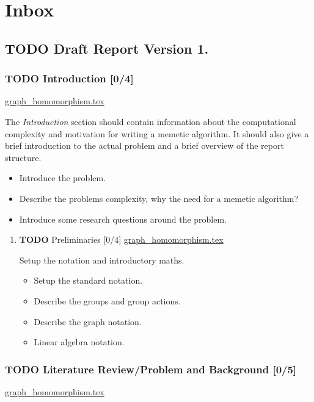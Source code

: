 \documentclass[11pt]{article}
\author{Euan Mendoza}
\date{\today}
\title{}
\begin{document}
\tableofcontents

\section{Inbox}
\label{sec:org5a95c71}
\subsection{{\bfseries\sffamily TODO} Draft Report Version 1.}
\label{sec:org92e5479}
\subsubsection{{\bfseries\sffamily TODO} Introduction [0/4]}
\label{sec:orgb53d6fd}
\url{graph\_homomorphism.tex}

The \emph{Introduction} section should contain information about the computational complexity and motivation for writing a memetic algorithm. It should also give a brief introduction to the actual problem and a brief overview of the report structure.

\begin{itemize}
\item[{$\square$}] Introduce the problem.
\item[{$\square$}] Describe the problems complexity, why the need for a memetic algorithm?
\item[{$\square$}] Introduce some research questions around the problem.
\end{itemize}
\begin{enumerate}
\item {\bfseries\sffamily TODO} Preliminaries [0/4]
\label{sec:org9d14430}
\url{graph\_homomorphism.tex}

Setup the notation and introductory maths.

\begin{itemize}
\item[{$\square$}] Setup the standard notation.
\item[{$\square$}] Describe the groups and group actions.
\item[{$\square$}] Describe the graph notation.
\item[{$\square$}] Linear algebra notation.
\end{itemize}
\end{enumerate}
\subsubsection{{\bfseries\sffamily TODO} Literature Review/Problem and Background [0/5]}
\label{sec:org1e8b06c}
\url{graph\_homomorphism.tex}
\end{document}

